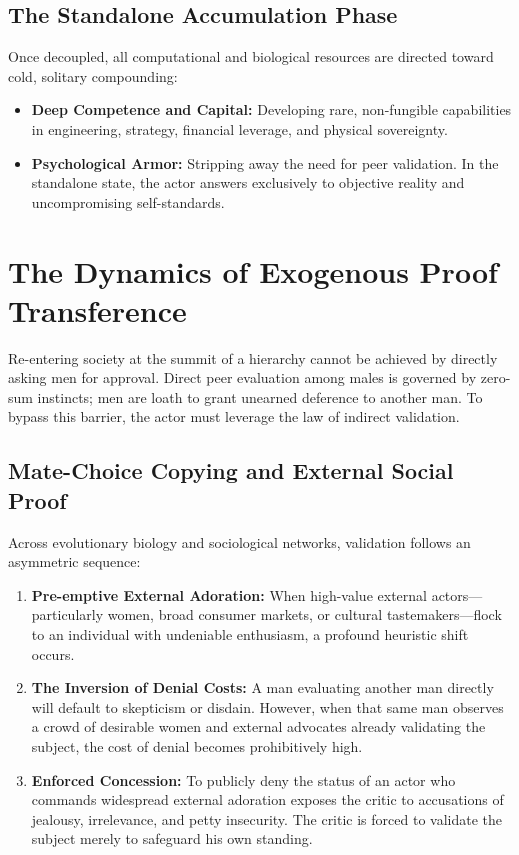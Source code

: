 \documentclass[11pt,a4paper]{article}
\begin{document}
\subsection{The Standalone Accumulation Phase}
Once decoupled, all computational and biological resources are directed toward cold, solitary compounding:
\begin{itemize}
    \item \textbf{Deep Competence and Capital:} Developing rare, non-fungible capabilities in engineering, strategy, financial leverage, and physical sovereignty.
    \item \textbf{Psychological Armor:} Stripping away the need for peer validation. In the standalone state, the actor answers exclusively to objective reality and uncompromising self-standards.
\end{itemize}

\section{The Dynamics of Exogenous Proof Transference}
Re-entering society at the summit of a hierarchy cannot be achieved by directly asking men for approval. Direct peer evaluation among males is governed by zero-sum instincts; men are loath to grant unearned deference to another man. To bypass this barrier, the actor must leverage the law of indirect validation.

\subsection{Mate-Choice Copying and External Social Proof}
Across evolutionary biology and sociological networks, validation follows an asymmetric sequence:
\begin{enumerate}
    \item \textbf{Pre-emptive External Adoration:} When high-value external actors—particularly women, broad consumer markets, or cultural tastemakers—flock to an individual with undeniable enthusiasm, a profound heuristic shift occurs.
    \item \textbf{The Inversion of Denial Costs:} A man evaluating another man directly will default to skepticism or disdain. However, when that same man observes a crowd of desirable women and external advocates already validating the subject, the cost of denial becomes prohibitively high.
    \item \textbf{Enforced Concession:} To publicly deny the status of an actor who commands widespread external adoration exposes the critic to accusations of jealousy, irrelevance, and petty insecurity. The critic is forced to validate the subject merely to safeguard his own standing.
\end{enumerate}
\end{document}
